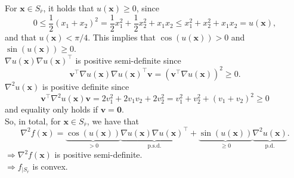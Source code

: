 \documentclass[a4paper]{article}
\begin{document}
{\begin{enumerate}
  For $\mathbf{x} \in S_{\bar{r}}$, it holds that $u(\mathbf{x}) \geq 0$, since $$0 \leq \frac{1}{2} (x_1 + x_2)^2 = \frac{1}{2}x_1^2 + \frac{1}{2}x_2^2 + x_1x_2 \leq x_1^2 + x_2^2 + x_1x_2 = u(\mathbf{x}),$$ and that $u(\mathbf{x}) < \pi/4$.
  This implies that $\cos(u(\mathbf{x})) > 0$ and $\sin(u(\mathbf{x})) \geq 0$. \\
  $\nabla u(\mathbf{x}) \nabla u(\mathbf{x})^\top$ is positive semi-definite since $$\mathbf{v}^\top \nabla u(\mathbf{x}) \nabla u(\mathbf{x})^\top \mathbf{v} = (\mathbf{v}^\top\nabla u(\mathbf{x}))^2 \geq 0.$$
  $\nabla^2 u(\mathbf{x})$ is positive definite since $$\mathbf{v}^\top \nabla^2 u(\mathbf{x}) \mathbf{v} = 2 v_1^2 + 2v_1v_2 + 2 v_2^2 = v_1^2 + v_2^2 + (v_1 + v_2)^2 \geq 0$$
  and equality only holds if $\mathbf{v} = \mathbf{0}$. \\
  So, in total, for $\mathbf{x} \in S_{\bar{r}}$, we have that
  \begin{equation*}
    \nabla^2 f(\mathbf{x}) = \underbrace{\cos(u(\mathbf{x}))}_{> 0} \underbrace{\nabla u(\mathbf{x}) \nabla u(\mathbf{x})^\top}_{\text{p.s.d.}} + \underbrace{\sin(u(\mathbf{x}))}_{\geq 0} \underbrace{\nabla^2 u(\mathbf{x})}_{\text{p.d.}}.
  \end{equation*}
  $\Rightarrow \nabla^2 f(\mathbf{x})$ is positive semi-definite. \\
  $\Rightarrow f_{|S_{\overline{r}}}$ is convex.

    


\end{enumerate}
}
\end{document}
